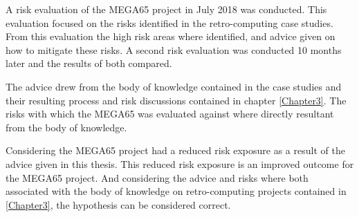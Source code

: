 A risk evaluation of the MEGA65 project in July 2018 was conducted. This evaluation focused on the risks identified in the retro-computing case studies. From this evaluation the high risk areas where identified, and advice given on how to mitigate these risks. A second risk evaluation was conducted 10 months later and the results of both compared.

The advice drew from the body of knowledge contained in the case studies and their resulting process and risk discussions contained in chapter \ref{Chapter3}. The risks with which the MEGA65 was evaluated against where directly resultant from the body of knowledge. 

Considering the MEGA65 project had a reduced risk exposure as a result of the advice given in this thesis. This reduced risk exposure is an improved outcome for the MEGA65 project. And considering the advice and risks where both associated with the body of knowledge on retro-computing projects contained in \ref{Chapter3}, the hypothesis can be considered correct.